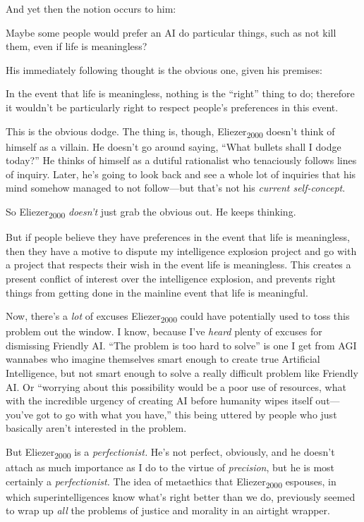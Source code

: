 {
 And yet then the notion occurs to him:}

{
 Maybe some people would prefer an AI do particular things, such as
not kill them, even if life is meaningless?}

{
 His immediately following thought is the obvious one, given his
premises:}

{
 In the event that life is meaningless, nothing is the
``right'' thing to do; therefore it
wouldn't be particularly right to respect
people's preferences in this event.}

{
 This is the obvious dodge. The thing is, though,
Eliezer\textsubscript{2000} doesn't think of himself as
a villain. He doesn't go around saying,
``What bullets shall I dodge
today?'' He thinks of himself as a dutiful
rationalist who tenaciously follows lines of inquiry. Later,
he's going to look back and see a whole lot of
inquiries that his mind somehow managed to not follow---but
that's not his \textit{current self-concept}.}

{
 So Eliezer\textsubscript{2000} \textit{doesn't}
just grab the obvious out. He keeps thinking.}

{
 But if people believe they have preferences in the event that life
is meaningless, then they have a motive to dispute my intelligence
explosion project and go with a project that respects their wish in the
event life is meaningless. This creates a present conflict of interest
over the intelligence explosion, and prevents right things from getting
done in the mainline event that life is meaningful.}

{
 Now, there's a \textit{lot} of excuses
Eliezer\textsubscript{2000} could have potentially used to toss this
problem out the window. I know, because I've
\textit{heard} plenty of excuses for dismissing Friendly AI.
``The problem is too hard to solve''
is one I get from AGI wannabes who imagine themselves smart enough to
create true Artificial Intelligence, but not smart enough to solve a
really difficult problem like Friendly AI. Or
``worrying about this possibility would be a poor use
of resources, what with the incredible urgency of creating AI before
humanity wipes itself out---you've got to go with what
you have,'' this being uttered by people who just
basically aren't interested in the problem.}

{
 But Eliezer\textsubscript{2000} is a \textit{perfectionist.}
He's not perfect, obviously, and he
doesn't attach as much importance as I do to the virtue
of \textit{precision}, but he is most certainly a
\textit{perfectionist.} The idea of metaethics that
Eliezer\textsubscript{2000} espouses, in which superintelligences know
what's right better than we do, previously seemed to
wrap up \textit{all} the problems of justice and morality in an
airtight wrapper.}

